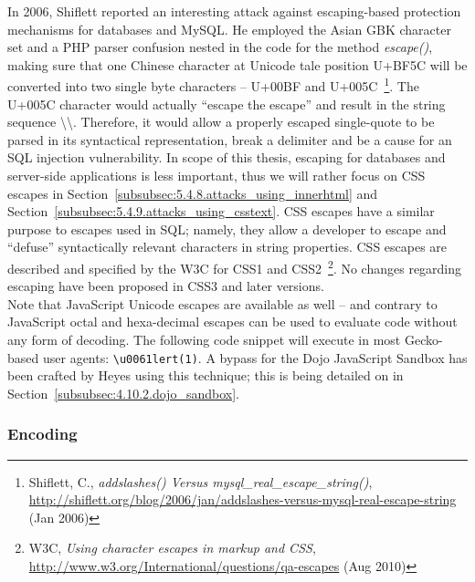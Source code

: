     In 2006, Shiflett reported an interesting attack against escaping-based protection mechanisms for databases and MySQL. He employed the Asian GBK character set and a PHP parser confusion nested in the code for the method \textit{escape()}, making sure that one Chinese character at Unicode tale position U+BF5C will be converted into two single byte characters -- U+00BF and U+005C~\footnote{Shiflett, C., \textit{addslashes() Versus mysql\_real\_escape\_string()}, \url{http://shiflett.org/blog/2006/jan/addslashes-versus-mysql-real-escape-string} (Jan 2006)}. The U+005C character would actually ``escape the escape'' and result in the string sequence \textbackslash\textbackslash. Therefore, it would allow a properly escaped single-quote to be parsed in its syntactical representation, break a delimiter and be a cause for an SQL injection vulnerability. In scope of this thesis, escaping for databases and server-side applications is less important, thus we will rather focus on CSS escapes in Section~\ref{subsubsec:5.4.8.attacks_using_innerhtml} and Section~\ref{subsubsec:5.4.9.attacks_using_csstext}. CSS escapes have a similar purpose to escapes used in SQL; namely, they allow a developer to escape and ``defuse'' syntactically relevant characters in string properties. CSS escapes are described and specified by the W3C for CSS1 and CSS2~\footnote{W3C, \textit{Using character escapes in markup and CSS}, \url{http://www.w3.org/International/questions/qa-escapes} (Aug 2010)}. No changes regarding escaping have been proposed in CSS3 and later versions. \\

    Note that JavaScript Unicode escapes are available as well -- and contrary to JavaScript octal and hexa-decimal escapes can be used to evaluate code without any form of decoding. The following code snippet will execute in most Gecko-based user agents: \texttt{\textbackslash u0061lert(1)}. A bypass for the Dojo JavaScript Sandbox has been crafted by Heyes using this technique; this is being detailed on in Section~\ref{subsubsec:4.10.2.dojo_sandbox}.

    \subsubsection{Encoding}
    \label{subsubsec:4.3.4.encoding}


